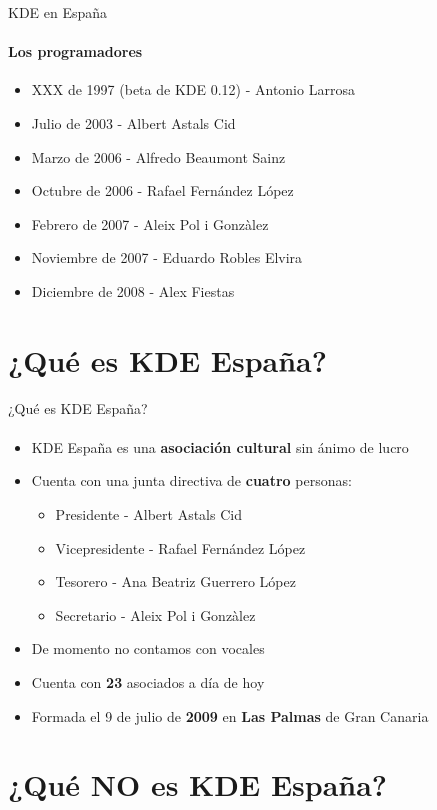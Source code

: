 \documentclass[12pt]{beamer}
\begin{document}
\begin{frame}{KDE en España}
	\framesubtitle{Los programadores}
	\begin{itemize}
		\item XXX de 1997 (beta de KDE 0.12) - Antonio Larrosa
 		\item Julio de 2003 - Albert Astals Cid
		\item Marzo de 2006 - Alfredo Beaumont Sainz
		\item Octubre de 2006 - Rafael Fernández López
		\item Febrero de 2007 - Aleix Pol i Gonzàlez
		\item Noviembre de 2007 - Eduardo Robles Elvira
		\item Diciembre de 2008 - Alex Fiestas
	\end{itemize}
\end{frame}

\section{¿Qué es KDE España?}

\begin{frame}{¿Qué es KDE España?}
  \framesubtitle{}
  \begin{itemize}
    \item KDE España es una \textbf{asociación cultural} sin ánimo de lucro
    \item Cuenta con una junta directiva de \textbf{cuatro} personas:
    \begin{itemize}
      \item Presidente - Albert Astals Cid
      \item Vicepresidente - Rafael Fernández López
      \item Tesorero - Ana Beatriz Guerrero López
      \item Secretario - Aleix Pol i Gonzàlez
    \end{itemize}
    \item De momento no contamos con vocales
    \item Cuenta con \textbf{23} asociados a día de hoy
    \item Formada el 9 de julio de \textbf{2009} en \textbf{Las Palmas} de Gran Canaria
  \end{itemize}
\end{frame}

\section{¿Qué NO es KDE España?}
\end{document}

